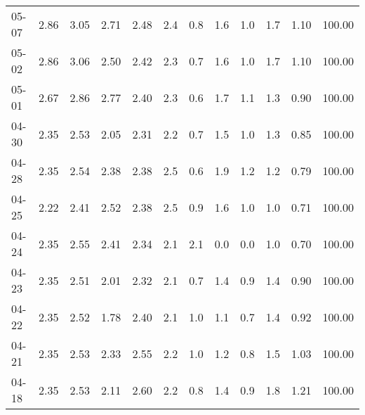 \begin{threeparttable}
{\begin{tabular}{lrrrrrrrrrrr}
  05-07 &          2.86 &          3.05 &          2.71 &        2.48 &                 2.4 &                 0.8 &        1.6 &                 1.0 &              1.7 &            1.10 &                 100.00 \\
  05-02 &          2.86 &          3.06 &          2.50 &        2.42 &                 2.3 &                 0.7 &        1.6 &                 1.0 &              1.7 &            1.10 &                 100.00 \\
  05-01 &          2.67 &          2.86 &          2.77 &        2.40 &                 2.3 &                 0.6 &        1.7 &                 1.1 &              1.3 &            0.90 &                 100.00 \\
  04-30 &          2.35 &          2.53 &          2.05 &        2.31 &                 2.2 &                 0.7 &        1.5 &                 1.0 &              1.3 &            0.85 &                 100.00 \\
  04-28 &          2.35 &          2.54 &          2.38 &        2.38 &                 2.5 &                 0.6 &        1.9 &                 1.2 &              1.2 &            0.79 &                 100.00 \\
  04-25 &          2.22 &          2.41 &          2.52 &        2.38 &                 2.5 &                 0.9 &        1.6 &                 1.0 &              1.0 &            0.71 &                 100.00 \\
  04-24 &          2.35 &          2.55 &          2.41 &        2.34 &                 2.1 &                 2.1 &        0.0 &                 0.0 &              1.0 &            0.70 &                 100.00 \\
  04-23 &          2.35 &          2.51 &          2.01 &        2.32 &                 2.1 &                 0.7 &        1.4 &                 0.9 &              1.4 &            0.90 &                 100.00 \\
  04-22 &          2.35 &          2.52 &          1.78 &        2.40 &                 2.1 &                 1.0 &        1.1 &                 0.7 &              1.4 &            0.92 &                 100.00 \\
  04-21 &          2.35 &          2.53 &          2.33 &        2.55 &                 2.2 &                 1.0 &        1.2 &                 0.8 &              1.5 &            1.03 &                 100.00 \\
  04-18 &          2.35 &          2.53 &          2.11 &        2.60 &                 2.2 &                 0.8 &        1.4 &                 0.9 &              1.8 &            1.21 &                 100.00 \\

\end{tabular}}
\end{threeparttable}
